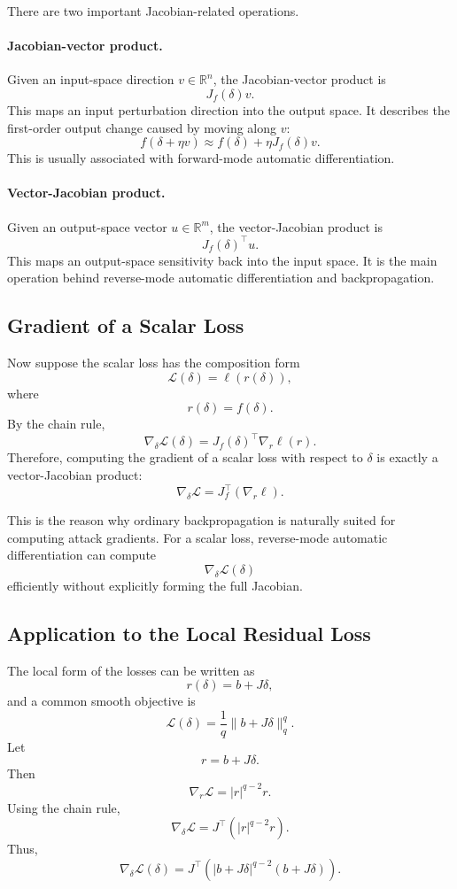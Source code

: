 \documentclass{article}
\begin{document}
There are two important Jacobian-related operations.

\paragraph{Jacobian-vector product.}
Given an input-space direction $v\in\mathbb R^n$, the Jacobian-vector product is
\[
J_f(\delta)v.
\]
This maps an input perturbation direction into the output space. It describes the first-order output change caused by moving along $v$:
\[
f(\delta+\eta v)
\approx
f(\delta)+\eta J_f(\delta)v.
\]
This is usually associated with forward-mode automatic differentiation.

\paragraph{Vector-Jacobian product.}
Given an output-space vector $u\in\mathbb R^m$, the vector-Jacobian product is
\[
J_f(\delta)^\top u.
\]
This maps an output-space sensitivity back into the input space. It is the main operation behind reverse-mode automatic differentiation and backpropagation.

\subsection{Gradient of a Scalar Loss}

Now suppose the scalar loss has the composition form
\[
\mathcal L(\delta)=\ell(r(\delta)),
\]
where
\[
r(\delta)=f(\delta).
\]
By the chain rule,
\[
\nabla_\delta \mathcal L(\delta)
=
J_f(\delta)^\top \nabla_r \ell(r).
\]
Therefore, computing the gradient of a scalar loss with respect to $\delta$ is exactly a vector-Jacobian product:
\[
\boxed{
\nabla_\delta \mathcal L
=
J_f^\top
\left(
\nabla_r \ell
\right).
}
\]

This is the reason why ordinary backpropagation is naturally suited for computing attack gradients. For a scalar loss, reverse-mode automatic differentiation can compute
\[
\nabla_\delta \mathcal L(\delta)
\]
efficiently without explicitly forming the full Jacobian.

\subsection{Application to the Local Residual Loss}

The local form of the losses can be written as
\[
r(\delta)=b+J\delta,
\]
and a common smooth objective is
\[
\mathcal L(\delta)
=
\frac{1}{q}\|b+J\delta\|_q^q.
\]
Let
\[
r=b+J\delta.
\]
Then
\[
\nabla_r \mathcal L
=
|r|^{q-2}r.
\]
Using the chain rule,
\[
\nabla_\delta \mathcal L
=
J^\top
\left(
|r|^{q-2}r
\right).
\]
Thus,
\[
\boxed{
\nabla_\delta \mathcal L(\delta)
=
J^\top
\left(
|b+J\delta|^{q-2}(b+J\delta)
\right).
}
\]
\end{document}
